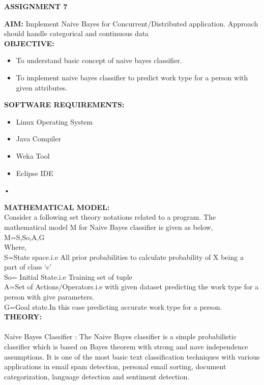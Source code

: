 \documentclass[11pt]{article}
\begin{document}
	
	\begin{center}
		\textbf{ASSIGNMENT 7}
	\end{center}
	\textbf{AIM:}
	Implement Naive Bayes for Concurrent/Distributed application. Approach should handle
	categorical and continuous data \\ 
	
	
	\noindent \textbf{OBJECTIVE:}
	\begin{itemize}
		\item To understand basic concept of naive bayes classifier.
		\item To implement naive bayes classifier to predict work type for a person with given attributes.
	\end{itemize}
	
	\noindent \textbf{SOFTWARE REQUIREMENTS:}
	\begin{itemize}
		\item Linux Operating System
		\item Java Compiler
		\item Weka Tool
		\item Eclipse IDE
	\end{itemize}•
	
	\noindent \textbf{MATHEMATICAL MODEL:} \\
	Consider a following set theory notations related to a program. The mathematical model M for
	Naive Bayes classifier is given as below, \\
	M={S,So,A,G} \\
	Where, \\
	S=State space.i.e All prior probabilities to calculate probability of X being a \\
	part of class ‘c’ \\
	So= Initial State.i.e Training set of tuple \\
	A=Set of Actions/Operators.i.e with given dataset predicting the work type
	for a person with give parameters. \\
	G=Goal state.In this case predicting accurate work type for a person. \\
	
	\noindent \textbf{THEORY:} \\
	\paragraph{}
	Naive Bayes Classifier :
	The Naive Bayes classifier is a simple probabilistic classifier which is based on Bayes
	theorem with strong and nave independence assumptions. It is one of the most basic text
	classification techniques with various applications in email spam detection, personal email
	sorting, document categorization, language detection and sentiment detection.
	
\end{document}
